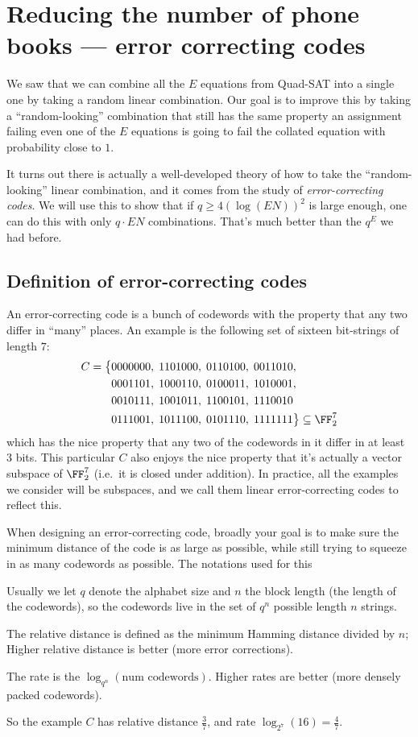 \documentclass[11pt]{scrreprt}
\begin{document}
\section{Reducing the number of phone books --- error correcting codes}
We saw that we can combine all the $E$ equations from Quad-SAT into a single one
by taking a random linear combination.
Our goal is to improve this by taking a ``random-looking'' combination
that still has the same property an assignment failing even one of the $E$ equations
is going to fail the collated equation with probability close to $1$.

It turns out there is actually a well-developed theory of how to take
the ``random-looking'' linear combination,
and it comes from the study of \emph{error-correcting codes}.
We will use this to show that if $q \ge 4(\log (EN))^2$ is large enough,
one can do this with only $q \cdot EN$ combinations.
That's much better than the $q^E$ we had before.

\subsection{Definition of error-correcting codes}
An \alert{error-correcting code} is a bunch of codewords
with the property that any two differ in ``many'' places.
An example is the following set of sixteen bit-strings of length $7$:
\begin{align*}
  C = \big\{
    & 0000000, \; 1101000, \; 0110100, \; 0011010, \\
    & 0001101, \; 1000110, \; 0100011, \; 1010001, \\
    & 0010111, \; 1001011, \; 1100101, \; 1110010 \\
    & 0111001, \; 1011100, \; 0101110, \; 1111111 \big\} \subseteq \FF_2^7
\end{align*}
which has the nice property that any two of the codewords in it differ in at least $3$ bits.
This particular $C$ also enjoys the nice property that it's actually
a vector subspace of $\FF_2^7$ (i.e.\ it is closed under addition).
In practice, all the examples we consider will be subspaces,
and we call them \alert{linear error-correcting codes} to reflect this.

When designing an error-correcting code, broadly your goal is to make sure the
minimum distance of the code is as large as possible,
while still trying to squeeze in as many codewords as possible.
The notations used for this
\begin{itemize}
  \ii Usually we let $q$ denote the alphabet size and $n$ the block length
  (the length of the codewords),
  so the codewords live in the set of $q^n$ possible length $n$ strings.

  \ii The \alert{relative distance} is defined as the minimum Hamming distance divided by $n$;
  Higher relative distance is better (more error corrections).

  \ii The \alert{rate} is the $\log_{q^n}(\text{num codewords})$.
  Higher rates are better (more densely packed codewords).
\end{itemize}
So the example $C$ has relative distance $\frac 37$,
and rate $\log_{2^7}(16) = \frac 47$.
\end{document}
